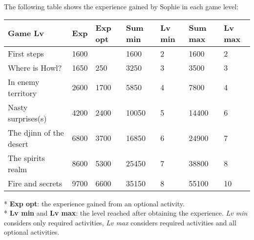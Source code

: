 The following table shows the experience gained by Sophie in each game level:
\begin{table}[H]
\centering
\begin{tabular}{|p{4cm}|l|l|l|l|l|l|}
\hline
\rowcolor[HTML]{C0C0C0} 
\textbf{Game Lv} & \textbf{Exp} & \textbf{Exp opt} & \textbf{Sum min} & \textbf{Lv min} & \textbf{Sum max} & \textbf{Lv max} \\ \hline
First steps & 1600 &  & 1600 & 2 & 1600 & 2 \\ \hline
Where is Howl? & 1650 & 250 & 3250 & 3 & 3500 & 3 \\ \hline
In enemy territory & 2600 & 1700 & 5850 & 4 & 7800 & 4 \\ \hline
Nasty surprises(s) & 4200 & 2400 & 10050 & 5 & 14400 & 6 \\ \hline
The djinn of the desert & 6800 & 3700 & 16850 & 6 & 24900 & 7 \\ \hline
The spirits realm & 8600 & 5300 & 25450 & 7 & 38800 & 8 \\ \hline
Fire and secrets & 9700 & 6600 & 35150 & 8 & 55100 & 10 \\ \hline
\end{tabular}
\end{table}
* \textbf{Exp opt}: the experience gained from an optional activity. \\
* \textbf{Lv min} and \textbf{Lv max}: the level reached after obtaining the experience. \textit{Lv min} considers only required activities, \textit{Lv max} considers required activities and all optional activities.

\pagebreak

